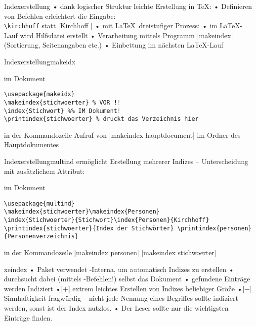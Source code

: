 \begin{frame}[fragile]{Indexerstellung}
• dank logischer Struktur leichte Erstellung in \TeX:
• Definieren von Befehlen erleichtert die Eingabe:\\%
\verb|\kirchhoff| statt |Kirchhoff |
• mit \LaTeX\ dreistufiger Prozess:
• im \LaTeX-Lauf wird Hilfsdatei erstellt
• Verarbeitung mittels Programm |makeindex| (Sortierung, Seitenangaben etc.)
• Einbettung im nächsten \LaTeX-Lauf
\•
\end{frame}

\begin{frame}[fragile]{Indexerstellung}{makeidx}
\begin{block}{im Dokument}
\begin{verbatim}
\usepackage{makeidx}
\makeindex{stichwoerter} % VOR !!
\index{Stichwort} %% IM Dokument!
\printindex{stichwoerter} % druckt das Verzeichnis hier
\end{verbatim}
\end{block}
\begin{block}{in der Kommandozeile}
Aufruf von |makeindex hauptdocument| im Ordner des Hauptdokumentes
\end{block}
\end{frame}

\begin{frame}[fragile]{Indexerstellung}{multind}
 ermöglicht Erstellung mehrerer Indizes – Unterscheidung mit zusätzlichem Attribut:
\begin{block}{im Dokument}
\begin{verbatim}
\usepackage{multind}
\makeindex{stichwoerter}\makeindex{Personen}
\index{Stichwoerter}{Stichwort}\index{Personen}{Kirchhoff}
\printindex{stichwoerter}{Index der Stichwörter} \printindex{personen}{Personenverzeichnis}
\end{verbatim}
\end{block}
\begin{block}{in der Kommandozeile}
|makeindex personen|
|makeindex stichwoerter|
\end{block}
\end{frame}

\begin{frame}[fragile]{xeindex}
• Paket  verwendet \XeTeX-Interna, um automatisch Indizes zu erstellen
•  durchsucht dabei (mittels \XeTeX-Befehlen!) selbst das Dokument
• gefundene Einträge werden Indiziert\pause
•[$+$] extrem leichtes Erstellen von Indizes beliebiger Größe
•[$-$] Sinnhaftigkeit fragwürdig – nicht jede Nennung eines Begriffes sollte indiziert werden, sonst ist der Index nutzlos.
• Der Leser sollte nur die wichtigsten Einträge finden.
\•
\end{frame}

